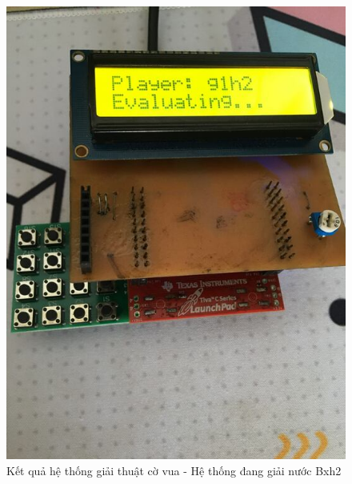 \begin{figure}[ht]
\centering
\includegraphics[scale=0.4]{images/chess_g1h2.jpg}
\caption{Kết quả hệ thống giải thuật cờ vua - Hệ thống đang giải nước Bxh2}
\label{fig:chess_g1h2}
\end{figure}

